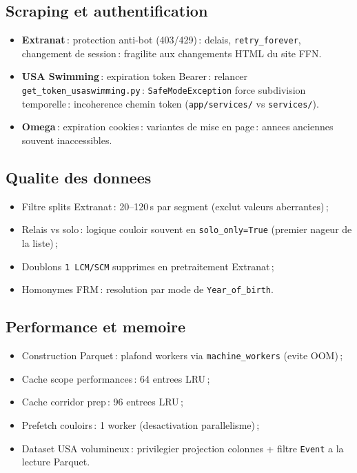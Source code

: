\documentclass[11pt,a4paper]{article}
\begin{document}
\subsection{Scraping et authentification}

\begin{itemize}
  \item \textbf{Extranat}\,: protection anti-bot (403/429)\,: delais, \texttt{retry\_forever}, changement de session\,: fragilite aux changements HTML du site FFN.
  \item \textbf{USA Swimming}\,: expiration token Bearer\,: relancer \texttt{get\_token\_usaswimming.py}\,: \texttt{SafeModeException} force subdivision temporelle\,: incoherence chemin token (\texttt{app/services/} vs \texttt{services/}).
  \item \textbf{Omega}\,: expiration cookies\,: variantes de mise en page\,: annees anciennes souvent inaccessibles.
\end{itemize}

\subsection{Qualite des donnees}

\begin{itemize}
  \item Filtre splits Extranat\,: 20--120\,s par segment (exclut valeurs aberrantes)\,;
  \item Relais vs solo\,: logique couloir souvent en \texttt{solo\_only=True} (premier nageur de la liste)\,;
  \item Doublons \texttt{1 LCM/SCM} supprimes en pretraitement Extranat\,;
  \item Homonymes FRM\,: resolution par mode de \texttt{Year\_of\_birth}.
\end{itemize}

\subsection{Performance et memoire}

\begin{itemize}
  \item Construction Parquet\,: plafond workers via \texttt{machine\_workers} (evite OOM)\,;
  \item Cache scope performances\,: 64 entrees LRU\,;
  \item Cache corridor prep\,: 96 entrees LRU\,;
  \item Prefetch couloirs\,: 1 worker (desactivation parallelisme)\,;
  \item Dataset USA volumineux\,: privilegier projection colonnes + filtre \texttt{Event} a la lecture Parquet.
\end{itemize}
\end{document}
